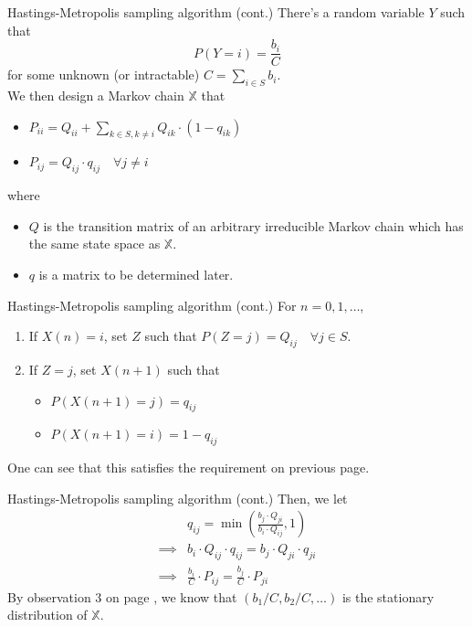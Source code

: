 \documentclass[mathserif]{beamer}
\begin{document}
\begin{frame}{Hastings-Metropolis sampling algorithm (cont.)}\label{possible_Y}
There's a random variable $Y$ such that
\[
P(Y=i) = \frac{b_i}{C}
\]
for some unknown (or intractable) $C = \sum_{i\in S}b_i$.\\
We then design a Markov chain $\mathbb{X}$ that
\begin{itemize}
\item $P_{ii} = Q_{ii} + \sum_{k\in S, k\neq i} Q_{ik}\cdot (1-q_{ik})$
\item $P_{ij} = Q_{ij}\cdot q_{ij} \quad\forall j\neq i$
\end{itemize}
where
\begin{itemize}
\item $Q$ is the transition matrix of an arbitrary irreducible Markov chain which has the same state space as $\mathbb{X}$.
\item $q$ is a matrix to be determined later.
\end{itemize}
\end{frame}

\begin{frame}{Hastings-Metropolis sampling algorithm (cont.)}
For $n = 0,1,\ldots$,
\begin{enumerate}
\item If $X(n)=i$, set $Z$ such that $P(Z = j) = Q_{ij} \quad\forall j\in S$.
\item If $Z = j$, set $X(n+1)$ such that
	\begin{itemize}
	\item $P(X(n+1)=j) = q_{ij}$
	\item $P(X(n+1)=i) = 1 - q_{ij}$
	\end{itemize}
\end{enumerate}
One can see that this satisfies the requirement on previous page.
\end{frame}

\begin{frame}{Hastings-Metropolis sampling algorithm (cont.)}
Then, we let
\begin{align*}
& q_{ij} = \min\left( \frac{b_j\cdot Q_{ji}}{b_i\cdot Q_{ij}}, 1 \right) \\
\implies & b_i\cdot Q_{ij}\cdot q_{ij} = b_j\cdot Q_{ji}\cdot q_{ji} \\
\implies & \frac{b_i}{C}\cdot P_{ij} = \frac{b_j}{C}\cdot P_{ji}
\end{align*}
By observation 3 on page \pageref{obs3}, we know that $(b_1/C, b_2/C,\ldots)$ is the stationary distribution of $\mathbb{X}$.
\end{frame}
\end{document}
